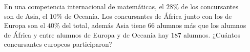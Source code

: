 En una competencia internacional de matemáticas, el $28\%$ de los concursantes son de Asia, el $10\%$ de Oceanía. Los concursantes de África junto con los de Europa
son el $40\%$ del total, además Asia tiene $66$ alumnos más que los alumnos de África y entre alumnos de Europa y de Oceanía hay $187$ alumnos. ¿Cuántos concursantes europeos participaron?